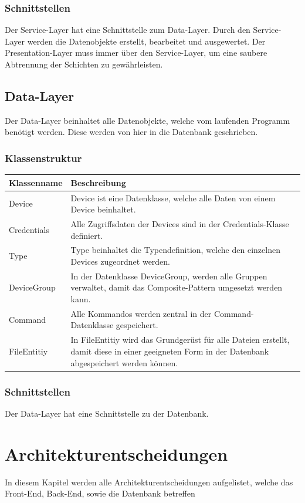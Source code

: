 \subsubsection{Schnittstellen}
Der Service-Layer hat eine Schnittstelle zum Data-Layer. Durch den Service-Layer werden die Datenobjekte erstellt, bearbeitet und ausgewertet. Der Presentation-Layer muss immer über den Service-Layer, um eine saubere Abtrennung der Schichten zu gewährleisten.

\subsection{Data-Layer}
Der Data-Layer beinhaltet alle Datenobjekte, welche vom laufenden Programm benötigt werden. Diese werden von hier in die Datenbank geschrieben.
\subsubsection{Klassenstruktur}
\begin{table}[H]
\centering
    \begin{tabular}{@{}l p{14.1cm} @{}}\toprule    
    {Klassenname} & {Beschreibung}\\ \midrule
    Device & Device ist eine Datenklasse, welche alle Daten von einem Device beinhaltet.\\
    Credentials & Alle Zugriffsdaten der Devices sind in der Credentials-Klasse definiert. \\
    Type & Type beinhaltet die Typendefinition, welche den einzelnen Devices zugeordnet werden. \\
    DeviceGroup & In der Datenklasse DeviceGroup, werden alle Gruppen verwaltet, damit das Composite-Pattern umgesetzt werden kann.\\
    Command & Alle Kommandos werden zentral in der Command-Datenklasse gespeichert.\\
    FileEntitiy & In FileEntitiy wird das Grundgerüst für alle Dateien erstellt, damit diese in einer geeigneten Form in der Datenbank abgespeichert werden können.\\ 
    \bottomrule
    \end{tabular}
\end{table}
\subsubsection{Schnittstellen}
Der Data-Layer hat eine Schnittstelle zu der Datenbank.

\section{Architekturentscheidungen}
In diesem Kapitel werden alle Architekturentscheidungen aufgelistet, welche das Front-End, Back-End, sowie die Datenbank betreffen
